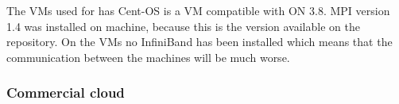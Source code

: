 The VMs used for has Cent-OS is a VM compatible with ON 3.8. MPI version 1.4 was installed on machine, because this is the version available on the repository. On the VMs no InfiniBand has been installed which means that the communication between the machines will be much worse.


\subsubsection{Commercial cloud}
